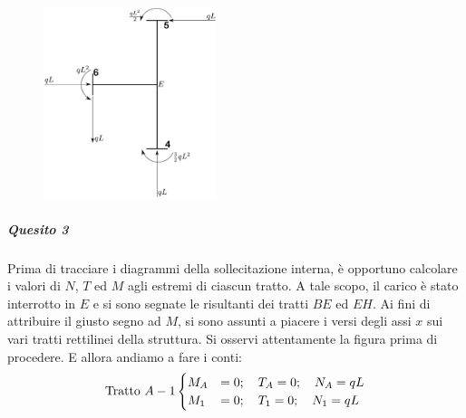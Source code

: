 \renewcommand{\thefigure}{12.2~-~6}
\begin{figure}[ht]
\centering
\includegraphics[width=0.45\textwidth]{Immagini/Parte_12/Esercizio12_2/12_2_6.pdf}
\caption{}
\label{Esercizio12-2-6}
\end{figure}
\subparagraph{Quesito 3}
Prima di tracciare i diagrammi della sollecitazione interna, è opportuno calcolare i valori di $N$, $T$ ed $M$ agli estremi di ciascun tratto. A tale scopo, il carico è stato interrotto in $E$ e si sono segnate le risultanti dei tratti $BE$ ed $EH$. Ai fini di attribuire il giusto segno ad $M$, si sono assunti a piacere i versi degli assi $x$ sui vari tratti rettilinei della struttura. Si osservi attentamente la figura prima di procedere. E allora andiamo a fare i conti:
\begin{equation*}
\text{Tratto } A-1
\begin{cases}
M_{A} &= 0; \quad T_{A} = 0; \quad  N_{A} = qL  \notag \\
M_{1} &= 0; \quad T_{1} = 0;  \quad N_{1} = qL  \notag 
\end{cases}
\end{equation*}

